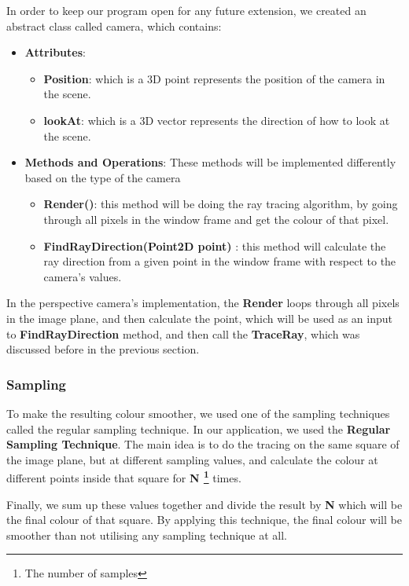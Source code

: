 \documentclass[a4paper]{report}
\begin{document}
	In order to keep our program open for any future extension, we created an abstract class called camera, which contains:
	\begin{itemize}
		\item \textbf{Attributes}:
		\begin{itemize} 
			\item \textbf{Position}: which is a 3D point represents the position of the camera in the scene.
			\item \textbf{lookAt}: which is a 3D vector represents the direction of how to look at the scene.
		\end{itemize}
		\item \textbf{Methods and Operations}: These methods will be implemented differently based on the type of the camera
		\begin{itemize} 
			\item \textbf{Render()}: this method will be doing the ray tracing algorithm, by going through all pixels in the window frame and get the colour of that pixel.
			\item \textbf{FindRayDirection(Point2D point)} : this method will calculate the ray direction from a given point in the window frame with respect to the camera's values.
		\end{itemize}
	\end{itemize}
	\par In the perspective camera's implementation, the \textbf{Render} loops through all pixels in the image plane,  and then calculate the point, which will be used as an input to \textbf{FindRayDirection} method, and then call the \textbf{TraceRay}, which was discussed before in the previous section. 
	\subsubsection{Sampling}
	To make the resulting colour smoother, we used one of the sampling techniques called the regular sampling technique. In our application, we used the \textbf{Regular Sampling Technique}. The main idea is to do the tracing on the same square of the image plane, but at different sampling values, and calculate the colour at different points inside that square for \textbf{N \footnote{The number of samples}} times.\newline
	\par Finally, we sum up these values together and divide the result by \textbf{N} which will be the final colour of that square. By applying this technique, the final colour will be smoother than not utilising any sampling technique at all.
\end{document}
